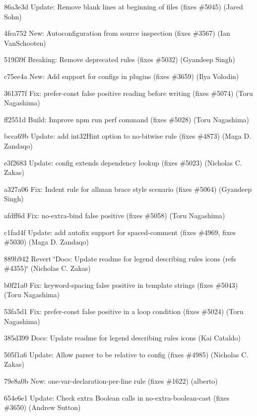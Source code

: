 \begin{DoxyItemize}
\item 86a3e3d Update\+: Remove blank lines at beginning of files (fixes \#5045) (Jared Sohn)
\item 4fea752 New\+: Autoconfiguration from source inspection (fixes \#3567) (Ian Van\+Schooten)
\item 519f39f Breaking\+: Remove deprecated rules (fixes \#5032) (Gyandeep Singh)
\item c75ee4a New\+: Add support for configs in plugins (fixes \#3659) (Ilya Volodin)
\item 361377f Fix\+: {\ttfamily prefer-\/const} false positive reading before writing (fixes \#5074) (Toru Nagashima)
\item ff2551d Build\+: Improve {\ttfamily npm run perf} command (fixes \#5028) (Toru Nagashima)
\item bcca69b Update\+: add int32\+Hint option to {\ttfamily no-\/bitwise} rule (fixes \#4873) (Maga D. Zandaqo)
\item e3f2683 Update\+: config extends dependency lookup (fixes \#5023) (Nicholas C. Zakas)
\item a327a06 Fix\+: Indent rule for allman brace style scenario (fixes \#5064) (Gyandeep Singh)
\item afdff6d Fix\+: {\ttfamily no-\/extra-\/bind} false positive (fixes \#5058) (Toru Nagashima)
\item c1fad4f Update\+: add autofix support for spaced-\/comment (fixes \#4969, fixes \#5030) (Maga D. Zandaqo)
\item 889b942 Revert \char`\"{}\+Docs\+: Update readme for legend describing rules icons (refs \#4355)\char`\"{} (Nicholas C. Zakas)
\item b0f21a0 Fix\+: {\ttfamily keyword-\/spacing} false positive in template strings (fixes \#5043) (Toru Nagashima)
\item 53fa5d1 Fix\+: {\ttfamily prefer-\/const} false positive in a loop condition (fixes \#5024) (Toru Nagashima)
\item 385d399 Docs\+: Update readme for legend describing rules icons (Kai Cataldo)
\item 505f1a6 Update\+: Allow parser to be relative to config (fixes \#4985) (Nicholas C. Zakas)
\item 79e8a0b New\+: {\ttfamily one-\/var-\/declaration-\/per-\/line} rule (fixes \#1622) (alberto)
\item 654e6e1 Update\+: Check extra Boolean calls in no-\/extra-\/boolean-\/cast (fixes \#3650) (Andrew Sutton)
\end{DoxyItemize}

